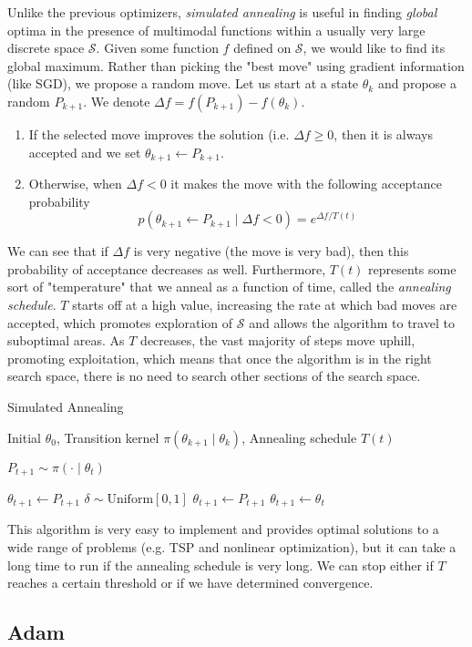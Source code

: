 \documentclass{article}
\theoremstyle{remark}
\theoremstyle{definition}
\begin{document}
Unlike the previous optimizers, \textit{simulated annealing} is useful in finding \textit{global} optima in the presence of multimodal functions within a usually very large discrete space $\mathcal{S}$. Given some function $f$ defined on $\mathcal{S}$, we would like to find its global maximum. Rather than picking the "best move" using gradient information (like SGD), we propose a random move. Let us start at a state $\theta_k$ and propose a random $P_{k+1}$. We denote $\Delta f = f(P_{k+1}) - f(\theta_k)$. 
\begin{enumerate}
    \item If the selected move improves the solution (i.e. $\Delta f \geq 0$, then it is always accepted and we set $\theta_{k+1} \gets P_{k+1}$. 
    \item Otherwise, when $\Delta f < 0$ it makes the move with the following acceptance probability 
    \[p(\theta_{k+1} \gets P_{k+1} \mid \Delta f < 0) = e^{\Delta f / T(t)}\]
\end{enumerate}
We can see that if $\Delta f$ is very negative (the move is very bad), then this probability of acceptance decreases as well. Furthermore, $T(t)$ represents some sort of "temperature" that we anneal as a function of time, called the \textit{annealing schedule}. $T$ starts off at a high value, increasing the rate at which bad moves are accepted, which promotes exploration of $\mathcal{S}$ and allows the algorithm to travel to suboptimal areas. As $T$ decreases, the vast majority of steps move uphill, promoting exploitation, which means that once the algorithm is in the right search space, there is no need to search other sections of the search space. 

\begin{algorithm}
\caption{Simulated Annealing}\label{alg:cap}
\begin{algorithmic}

\Require Initial $\theta_0$, Transition kernel $\pi(\theta_{k+1} \mid \theta_k)$, Annealing schedule $T(t)$

    \State $P_{t+1} \sim \pi( \cdot \mid \theta_t)$
    
        \State $\theta_{t+1} \gets P_{t+1}$ 
    \Else 
        \State $\delta \sim \mathrm{Uniform}[0, 1]$
        \If{$\delta < \exp[(f(P_{t+1}) - f(\theta_t))/T(t)]$}
            \State $\theta_{t+1} \gets P_{t+1}$ 
        \Else 
            \State $\theta_{t+1} \gets \theta_t$ 
        \EndIf
    \EndIf
\EndFor

\end{algorithmic}
\end{algorithm}

This algorithm is very easy to implement and provides optimal solutions to a wide range of problems (e.g. TSP and nonlinear optimization), but it can take a long time to run if the annealing schedule is very long. We can stop either if $T$ reaches a certain threshold or if we have determined convergence. 

\subsection{Adam}
\end{document}
